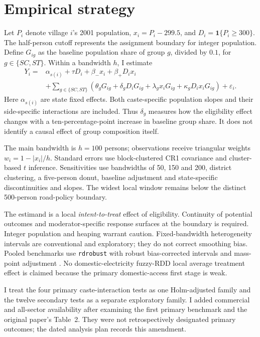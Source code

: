 \documentclass[11pt,a4paper]{article}
\begin{document}
\section{Empirical strategy}
Let $P_i$ denote village $i$'s 2001 population, $x_i=P_i-299.5$, and $D_i=\mathbf{1}\{P_i\geq300\}$. The half-person cutoff represents the assignment boundary for integer population. Define $G_{ig}$ as the baseline population share of group $g$, divided by $0.1$, for $g\in\{SC,ST\}$. Within a bandwidth $h$, I estimate
\begin{align}
Y_i ={}& \alpha_{s(i)}+\tau D_i+\beta_-x_i+\beta_+D_ix_i \nonumber\\
&+\sum_{g\in\{SC,ST\}}\left(\theta_gG_{ig}+\delta_gD_iG_{ig}
+\lambda_gx_iG_{ig}+\kappa_gD_ix_iG_{ig}\right)+\varepsilon_i.
\label{eq:main}
\end{align}
Here $\alpha_{s(i)}$ are state fixed effects. Both caste-specific population slopes and their side-specific interactions are included. Thus $\delta_g$ measures how the eligibility effect changes with a ten-percentage-point increase in baseline group share. It does not identify a causal effect of group composition itself.

The main bandwidth is $h=100$ persons; observations receive triangular weights $w_i=1-|x_i|/h$. Standard errors use block-clustered CR1 covariance and cluster-based $t$ inference. Sensitivities use bandwidths of 50, 150 and 200, district clustering, a five-person donut, baseline adjustment and state-specific discontinuities and slopes. The widest local window remains below the distinct 500-person road-policy boundary.

The estimand is a local \emph{intent-to-treat} effect of eligibility. Continuity of potential outcomes and moderator-specific response surfaces at the boundary is required. Integer population and heaping warrant caution. Fixed-bandwidth heterogeneity intervals are conventional and exploratory; they do not correct smoothing bias. Pooled benchmarks use \texttt{rdrobust} with robust bias-corrected intervals and mass-point adjustment \cite{rdrobust}. No domestic-electricity fuzzy-RDD local average treatment effect is claimed because the primary domestic-access first stage is weak.

I treat the four primary caste-interaction tests as one Holm-adjusted family and the twelve secondary tests as a separate exploratory family. I added commercial and all-sector availability after examining the first primary benchmark and the original paper's Table~2. They were not retrospectively designated primary outcomes; the dated analysis plan records this amendment.
\end{document}
